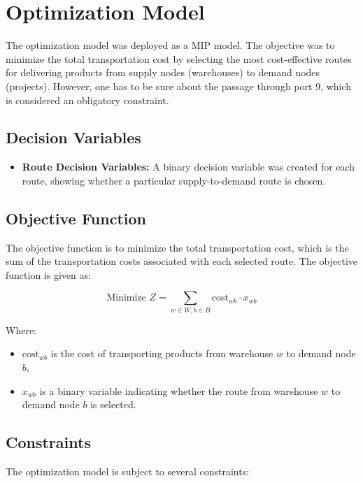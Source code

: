\documentclass{article}
\begin{document}
\section{Optimization Model}

The optimization model was deployed as a MIP model. The objective was to minimize the total transportation cost by selecting the most cost-effective routes for delivering products from supply nodes (warehouses) to demand nodes (projects). However, one has to be sure about the passage through port 9, which is considered an obligatory constraint. 

\subsection{Decision Variables}

\begin{itemize}
    \item \textbf{Route Decision Variables:} A binary decision variable was created for each route, showing whether a particular supply-to-demand route is chosen.
\end{itemize}

\subsection{Objective Function}

The objective function is to minimize the total transportation cost, which is the sum of the transportation costs associated with each selected route. The objective function is given as:

\[
\text{Minimize } Z = \sum_{w \in W, b \in B} \text{cost}_{wb} \cdot x_{wb}
\]

Where:
\begin{itemize}
    \item \( \text{cost}_{wb} \) is the cost of transporting products from warehouse \( w \) to demand node \( b \),
    \item \( x_{wb} \) is a binary variable indicating whether the route from warehouse \( w \) to demand node \( b \) is selected.
\end{itemize}

\subsection{Constraints}

The optimization model is subject to several constraints:
\end{document}
